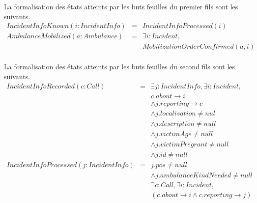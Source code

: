 	
	La formalisation des états atteints par les buts feuilles du premier fils sont
	les suivants.
	\singlespacing
	\begin{equation*}
		\begin{array}{rcl}
			IncidentInfoKnown(i:IncidentInfo)  
			& = & IncidentInfoProcessed(i) \\
			
			AmbulanceMobilized(a: Ambulance) 
			& = & \exists i:Incident, \\
			&   & MobilizationOrderConfirmed(a, i) \\
		\end{array}
	\end{equation*}
	\onehalfspacing
	
	La formalisation des états atteints par les buts feuilles du second fils sont
	les suivants.
	\singlespacing
	\begin{equation*}
		\begin{array}{rcl}
			IncidentInfoRecorded(c:Call)  
			& = & \exists j:IncidentInfo, \exists i:Incident, \\
			&   & c.about \rightarrow i \\
			&   & \wedge j.reporting \rightarrow c \\
			&   & \wedge j.localisation \neq nul \\
			&   & \wedge j.description \neq null \\
			&   & \wedge j.victimAge \neq null \\
			&   & \wedge j.victimPregrant \neq null \\
			&   & \wedge j.id \neq null \\
			
			IncidentInfoProcessed(j:IncidentInfo)  
			& = & j.pos \neq null \\
			&   & \wedge j.ambulanceKindNeeded \neq null \\
			&   & \exists c:Call, \exists i:Incident, \\
			&   & (c.about \rightarrow i \wedge c.reporting \rightarrow j) \\
		\end{array}
	\end{equation*}
	\onehalfspacing
	
